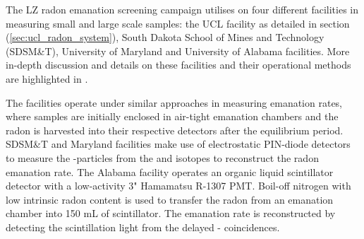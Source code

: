 The LZ radon emanation screening campaign utilises on four different facilities in measuring small and large scale samples: the UCL facility as detailed in section (\ref{sec:ucl_radon_system}), South Dakota School of Mines and Technology (SDSM&T), University of Maryland and University of Alabama facilities. More in-depth discussion and details on these facilities and their operational methods are highlighted in \cite{lz_screening}.

The facilities operate under similar approaches in measuring emanation rates, where samples are initially enclosed in air-tight emanation chambers and the radon is harvested into their respective detectors after the equilibrium period. SDSM\&T and Maryland facilities make use of electrostatic PIN-diode detectors to measure the \alpha-particles from the \PoTOF{} and \PoTOE{} isotopes to reconstruct the radon emanation rate. The Alabama facility operates an organic liquid scintillator detector with a low-activity 3" Hamamatsu R-1307 PMT. Boil-off nitrogen with low intrinsic radon content is used to transfer the radon from an emanation chamber into 150 mL of scintillator. The emanation rate is reconstructed by detecting the scintillation light from the delayed \BiTOF-\PoTOF{} coincidences. 

